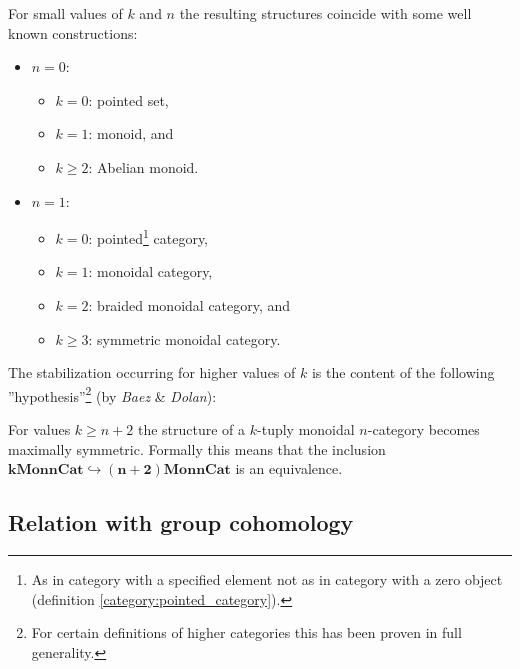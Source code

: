     \begin{example}
        For small values of $k$ and $n$ the resulting structures coincide with some well known constructions:
        \begin{itemize}
            \item $n=0$:
                \begin{itemize}
                    \item $k=0$: pointed set,
                    \item $k=1$: monoid, and
                    \item $k\geq2$: Abelian monoid.
                \end{itemize}
            \item $n=1$:
                \begin{itemize}
                    \item $k=0$: pointed\footnote{As in category with a specified element not as in category with a zero object (definition \ref{category:pointed_category}).} category,
                    \item $k=1$: monoidal category,
                    \item $k=2$: braided monoidal category, and
                    \item $k\geq3$: symmetric monoidal category.
                \end{itemize}
        \end{itemize}
    \end{example}
    The stabilization occurring for higher values of $k$ is the content of the following ''hypothesis''\footnote{For certain definitions of higher categories this has been proven in full generality.} (by \textit{Baez} \& \textit{Dolan}):
    \begin{theorem}
        For values $k\geq n+2$ the structure of a $k$-tuply monoidal $n$-category becomes maximally symmetric. Formally this means that the inclusion \emph{$\boldsymbol{k}\mathbf{Mon}\boldsymbol{n}\mathbf{Cat}\hookrightarrow\boldsymbol{(n+2)}\mathbf{Mon}\boldsymbol{n}\mathbf{Cat}$} is an equivalence.
    \end{theorem}

\subsection[Relation to group cohomology]{Relation with group cohomology\footnotemark}\label{section:hda_group_cohomology}

